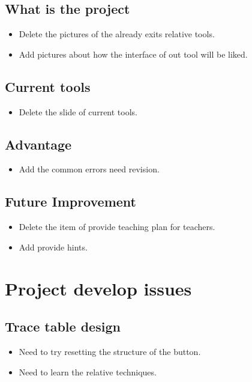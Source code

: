 \documentclass[11pt, a4paper]{article}
\begin{document}
\subsection{What is the project}
\begin{itemize}
\item Delete the pictures of the already exits relative tools.
\item Add pictures about how the interface of out tool will be liked.

\end{itemize}

\subsection{Current tools}
\begin{itemize}
\item Delete the slide of current tools.

\end{itemize}

\subsection{Advantage}
\begin{itemize}
\item  Add the common errors need revision.
\end{itemize}

\subsection{Future Improvement}
\begin{itemize}
\item Delete the item of provide teaching plan for teachers.
\item Add provide hints.
\end{itemize}


\section{Project develop issues}
\subsection{Trace table design}
\begin{itemize}
\item Need to try resetting the structure of the button.
\item Need to learn the relative techniques.
\end{itemize}
\end{document}
